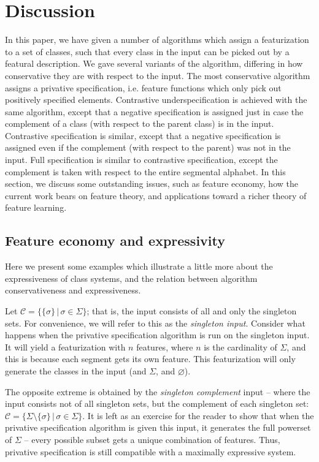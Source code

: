 \documentclass[11pt, oneside]{article}   	%
\begin{document}
\section{Discussion}

In this paper, we have given a number of algorithms which assign a featurization to a set of classes, such that every class in the input can be picked out by a featural description. We gave several variants of the algorithm, differing in how conservative they are with respect to the input. The most conservative algorithm assigns a privative specification, i.e. feature functions which only pick out positively specified elements. Contrastive underspecification is achieved with the same algorithm, except that a negative specification is assigned just in case the complement of a class (with respect to the parent class) is in the input. Contrastive specification is similar, except that a negative specification is assigned even if the complement (with respect to the parent) was not in the input. Full specification is similar to contrastive specification, except the complement is taken with respect to the entire segmental alphabet. In this section, we discuss some outstanding issues, such as feature economy, how the current work bears on feature theory, and applications toward a richer theory of feature learning.

\subsection{Feature economy and expressivity}

Here we present some examples which illustrate a little more about the expressiveness of class systems, and the relation between algorithm conservativeness and expressiveness.

Let $\mathcal C = \{ \{\sigma\} \, | \, \sigma \in \Sigma \}$; that is, the input consists of all and only the singleton sets. For convenience, we will refer to this as the \textit{singleton input}. Consider what happens when the privative specification algorithm is run on the singleton input. It will yield a featurization with $n$ features, where $n$ is the cardinality of $\Sigma$, and this is because each segment gets its own feature. This featurization will only generate the classes in the input (and $\Sigma$, and $\varnothing$).

The opposite extreme is obtained by the \textit{singleton complement} input -- where the input consists not of all singleton sets, but the complement of each singleton set:  $\mathcal C = \{ \Sigma \setminus \{\sigma\} \, | \, \sigma \in \Sigma \}$. It is left as an exercise for the reader to show that when the privative specification algorithm is given this input, it generates the full powerset of $\Sigma$ -- every possible subset gets a unique combination of features. Thus, privative specification is still compatible with a maximally expressive system.
\end{document}
